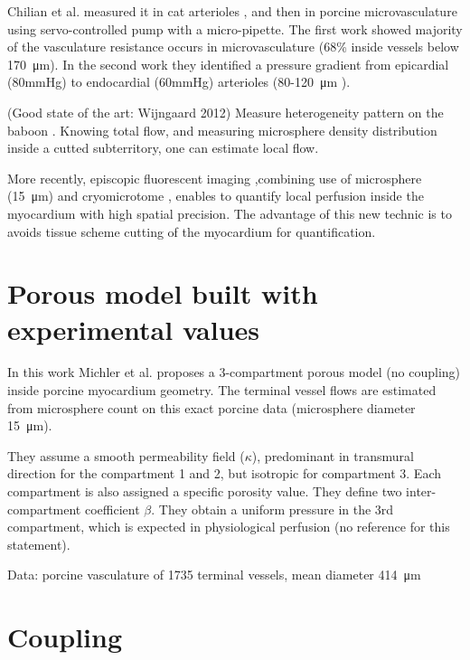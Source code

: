 \documentclass[a4paper, 11pt]{article} %
\begin{document}
Chilian et al.  measured it in cat arterioles \cite{chilian1989redistribution}, and then in porcine microvasculature \cite{chilian1991microvascular} using servo-controlled pump with a micro-pipette. The first work showed majority of the vasculature resistance occurs in microvasculature (68\% inside vessels below \SI{170}{\micro\meter}). In the second work they identified a pressure gradient from epicardial (80mmHg) to endocardial (60mmHg) arterioles (80-\SI{120}{\micro\meter} ). 

(Good state of the art: Wijngaard 2012)
Measure heterogeneity pattern on the baboon \cite{king1985stability}. Knowing total flow, and measuring microsphere density distribution inside a cutted subterritory, one can estimate local flow.  

More recently, episcopic fluorescent imaging ,combining use of microsphere (\SI{15}{\micro\meter}) and cryomicrotome \cite{van2010improved}, enables to quantify local perfusion inside the myocardium with high spatial precision. The advantage of this new technic is to avoids tissue scheme cutting of the myocardium for quantification. 




\section*{Porous model built with experimental values}

In this work \cite{michler2013computationally} Michler et al. proposes a 3-compartment porous model (no coupling) inside porcine myocardium geometry. The terminal vessel flows are estimated from microsphere count on this exact porcine data (microsphere diameter \SI{15}{\micro\meter}).

They assume a smooth permeability field ($\kappa$), predominant in transmural direction for the compartment 1 and 2, but isotropic for compartment 3. Each compartment is also assigned a specific porosity value. They define two inter-compartment coefficient $\beta$. They obtain a uniform pressure in the 3rd compartment, which is expected in physiological perfusion (no reference for this statement).

Data: porcine vasculature of 1735 terminal vessels, mean diameter \SI{414}{\micro\meter}\\



\section*{Coupling}
\end{document}

